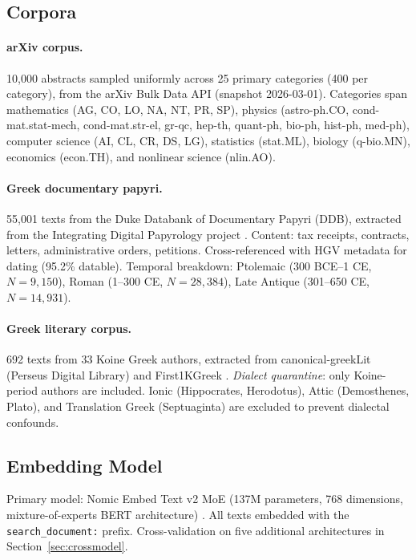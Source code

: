 \documentclass[12pt,letterpaper]{article}
\begin{document}
\subsection{Corpora}

\paragraph{arXiv corpus.}
10{,}000 abstracts sampled uniformly across 25 primary categories
(400 per category), from the arXiv Bulk Data API (snapshot
2026-03-01).  Categories span mathematics (AG, CO, LO, NA, NT, PR,
SP), physics (astro-ph.CO, cond-mat.stat-mech, cond-mat.str-el,
gr-qc, hep-th, quant-ph, bio-ph, hist-ph, med-ph), computer science
(AI, CL, CR, DS, LG), statistics (stat.ML), biology (q-bio.MN),
economics (econ.TH), and nonlinear science (nlin.AO).

\paragraph{Greek documentary papyri.}
55{,}001 texts from the Duke Databank of Documentary Papyri (DDB),
extracted from the Integrating Digital Papyrology project
\citep{papyriinfo}.  Content: tax receipts, contracts, letters,
administrative orders, petitions.  Cross-referenced with HGV
metadata for dating (95.2\% datable).  Temporal breakdown:
Ptolemaic (300 BCE--1 CE, $N=9{,}150$), Roman (1--300 CE,
$N=28{,}384$), Late Antique (301--650 CE, $N=14{,}931$).

\paragraph{Greek literary corpus.}
692 texts from 33 Koine Greek authors, extracted from
canonical-greekLit (Perseus Digital Library) and First1KGreek
\citep{first1kgreek}.  \emph{Dialect quarantine}: only
Koine-period authors are included.  Ionic (Hippocrates, Herodotus),
Attic (Demosthenes, Plato), and Translation Greek (Septuaginta) are
excluded to prevent dialectal confounds.

\subsection{Embedding Model}

Primary model: Nomic Embed Text v2 MoE (137M parameters, 768
dimensions, mixture-of-experts BERT architecture)
\citep{nomic2024}.  All texts embedded with the
\texttt{search\_document:} prefix.  Cross-validation on five
additional architectures in Section~\ref{sec:crossmodel}.
\end{document}
